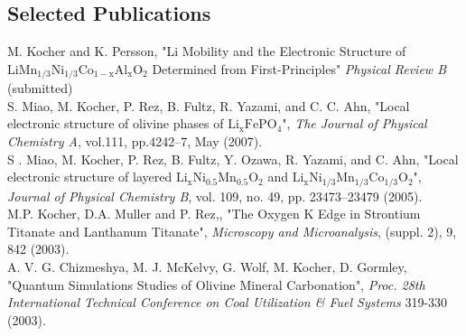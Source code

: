 \documentclass[margin,line]{resume}
\begin{document}
\begin{resume}

  \section{\mysidestyle Selected Publications}
    M. Kocher and K. Persson, "Li Mobility and the Electronic Structure of $\mathrm{LiMn_{1/3}Ni_{1/3}Co_{1-x}Al_{x}O_{2}}$ Determined from First-Principles" \textsl{Physical Review B} (submitted)\vspace{2mm}\\
    S. Miao, M. Kocher, P. Rez, B. Fultz, R. Yazami, and C. C. Ahn, "Local electronic structure of olivine phases of $\mathrm{Li_xFePO_4}$", \textsl{The Journal of Physical Chemistry A}, vol.111, pp.4242–7, May (2007).\vspace{2mm}\\
    S . Miao, M. Kocher, P. Rez, B. Fultz, Y. Ozawa, R. Yazami, and C. Ahn, "Local electronic structure of layered $\mathrm{Li_xNi_{0.5}Mn_{0.5}O_2}$ and $\mathrm{Li_{x}Ni_{1/3}Mn_{1/3}Co_{1/3}O_2}$", \textsl{Journal of Physical Chemistry B}, vol. 109, no. 49, pp. 23473–23479 (2005).\vspace{2mm}\\
    M.P. Kocher, D.A. Muller and P. Rez,, "The Oxygen K Edge in Strontium Titanate and Lanthanum Titanate", \textsl{Microscopy and Microanalysis}, (suppl. 2), 9, 842 (2003).\vspace{2mm}\\
    A. V. G. Chizmeshya, M. J. McKelvy, G. Wolf, M. Kocher, D. Gormley, "Quantum Simulations Studies of Olivine Mineral Carbonation", \textsl{Proc. 28th International Technical Conference on Coal Utilization   \& Fuel Systems} 319-330 (2003).

   \newpage

\end{resume}
\end{document}
